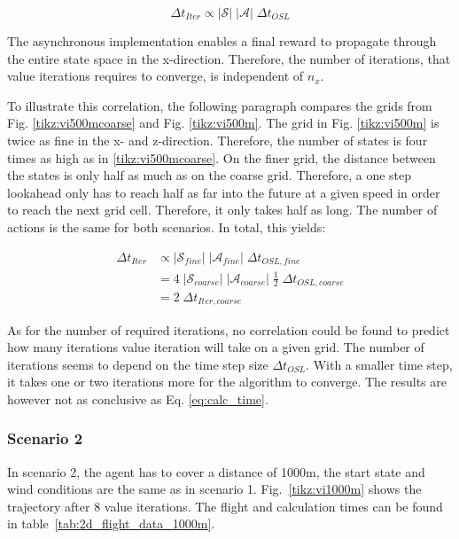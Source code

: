 \begin{equation}
	\Delta t_{Iter} \propto |\mathcal{S}| \; |\mathcal{A}| \; \Delta t_{OSL}
	\label{eq:calc_time}
\end{equation}

The asynchronous implementation enables a final reward to propagate through the entire state space in the x-direction. Therefore, the number of iterations, that value iterations requires to converge, is independent of $n_x$.

To illustrate this correlation, the following paragraph compares the grids from Fig. \ref{tikz:vi500mcoarse} and Fig. \ref{tikz:vi500m}. The grid in Fig. \ref{tikz:vi500m} is twice as fine in the x- and z-direction. Therefore, the number of states is four times as high as in \ref{tikz:vi500mcoarse}. On the finer grid, the distance between the states is only half as much as on the coarse grid. Therefore, a one step lookahead only has to reach half as far into the future at a given speed in order to reach the next grid cell. Therefore, it only takes half as long. The number of actions is the same for both scenarios. In total, this yields:

\begin{align}
\Delta t_{Iter} &\propto |\mathcal{S}_{fine}| \; |\mathcal{A}_{fine}| \; \Delta t_{OSL,fine} \\
&= 4 \; |\mathcal{S}_{coarse}| \; |\mathcal{A}_{coarse}| \; \frac{1}{2} \; \Delta t_{OSL,coarse} \\
&= 2 \;\Delta t_{Iter,coarse}
\end{align}

As for the number of required iterations, no correlation could be found to predict how many iterations value iteration will take on a given grid. The number of iterations seems to depend on the time step size $\Delta t_{OSL}$. With a smaller time step, it takes one or two iterations more for the algorithm to converge. The results are however not as conclusive as Eq. \ref{eq:calc_time}.

\subsubsection{Scenario 2}

In scenario 2, the agent has to cover a distance of 1000m, the start state and wind conditions are the same as in scenario 1. Fig.~\ref{tikz:vi1000m} shows the trajectory after 8 value iterations. The flight and calculation times can be found in table~\ref{tab:2d_flight_data_1000m}.

